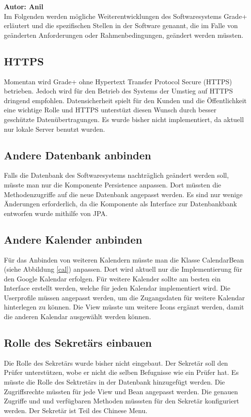 \textbf{Autor: Anil}\\
Im Folgenden werden mögliche Weiterentwicklungen des Softwaresystems \glqq{}Grade+\grqq{} erläutert und die spezifischen Stellen in der Software genannt, die im Falle von geänderten Anforderungen oder Rahmenbedingungen, geändert werden müssten.\\

\subsection{HTTPS}
Momentan wird  \glqq{}Grade+\grqq{} ohne Hypertext Transfer Protocol Secure (HTTPS) betrieben. 
Jedoch wird für den Betrieb des Systems der Umstieg auf HTTPS  dringend empfohlen. Datensicherheit spielt für den Kunden und die Öffentlichkeit eine wichtige Rolle und HTTPS unterstüzt diesen Wunsch durch besser geschützte Datenübertragungen. Es wurde  bisher nicht implementiert, da aktuell nur lokale Server benutzt wurden. 

\subsection{Andere Datenbank anbinden}
Falls die Datenbank des Softwaresystems nachträglich geändert werden soll, müsste man nur die Komponente Persistence anpassen.
Dort müssten die Methodenzugriffe auf die neue Datenbank angepasst werden. Es sind nur wenige Änderungen erforderlich, da die Komponente als Interface zur Datenbankbank entworfen wurde mithilfe von JPA.

\subsection{Andere Kalender anbinden}
Für das Anbinden von weiteren Kalendern müsste man die Klasse CalendarBean (siehe Abbildung \ref{cal}) anpassen. Dort wird aktuell nur die Implementierung für den Google Kalendar erfolgen. Für weitere  Kalender sollte am besten ein Interface erstellt werden, welche für jeden Kalendar implementiert wird. Die Userprofile müssen angepasst werden, um die Zugangsdaten für weitere Kalendar hinterlegen zu können. Die View müsste um weitere Icons ergänzt werden, damit die anderen Kalendar ausgewählt werden können.

\subsection{Rolle des Sekretärs einbauen}
Die Rolle des Sekretärs wurde bisher nicht eingebaut. Der Sekretär soll den Prüfer unterstützen, wobe er nicht die selben Befugnisse wie ein Prüfer hat.
Es müsste die Rolle des Sektretärs in der Datenbank hinzugefügt werden. Die Zugriffsrechte müssten für jede View  und Bean angepasst werden. Die genauen Zugriffe und und verfügbaren Methoden müsssten für den Sekretär konfiguriert werden. Der Sekretär ist Teil des Chinese Menu.

